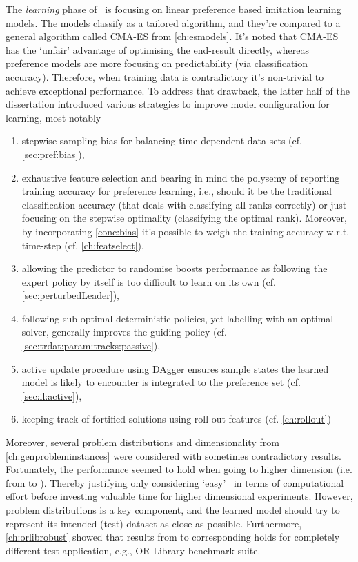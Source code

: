 The \emph{learning} phase of \Alice\ is focusing on linear preference based 
imitation learning models. The models classify as a tailored algorithm, and 
they're compared to a general algorithm called CMA-ES from \cref{ch:esmodels}. 
It's noted that CMA-ES has the `unfair' advantage of optimising the end-result 
directly, whereas preference models are more focusing on predictability (via 
classification accuracy). Therefore, when training data is contradictory it's 
non-trivial to achieve exceptional performance. 
To address that drawback, the latter half of the dissertation introduced 
various strategies to improve model configuration for learning, most notably 
\begin{enumerate}
    \item \label{conc:bias} stepwise sampling bias for balancing time-dependent 
    data sets (cf. \cref{sec:pref:bias}),
    \item exhaustive feature selection and bearing in mind the polysemy of 
    reporting training accuracy for preference learning, i.e., should it be the 
    traditional classification accuracy (that deals with classifying all ranks 
    correctly) or just focusing on the stepwise optimality (classifying the 
    optimal rank). Moreover, by incorporating \ref{conc:bias} it's possible to 
    weigh the training accuracy w.r.t. time-step 
    (cf. \cref{ch:featselect}),
    \item allowing the predictor to randomise boosts performance as following 
    the expert policy by itself is too difficult to learn on its own (cf. 
    \cref{sec:perturbedLeader}),
    \item following sub-optimal deterministic policies, yet labelling with an 
    optimal solver, generally improves the guiding policy (cf. 
    \cref{sec:trdat:param:tracks:passive}),
    \item active update procedure using DAgger ensures sample states the 
    learned model is likely to encounter is integrated to the preference set
    (cf. \cref{sec:il:active}),
    \item keeping track of fortified solutions using roll-out features (cf. 
    \cref{ch:rollout})
\end{enumerate}
Moreover, several problem distributions and dimensionality from 
\cref{ch:genprobleminstances} were considered with sometimes contradictory 
results. Fortunately, the performance seemed to hold when going to higher 
dimension (i.e. from \Problem[6\times5]{} to \Problem[10\times10]{}). 
Thereby justifying only considering `easy' \JSP\ in terms of computational 
effort before investing valuable time for higher dimensional experiments. 
However, problem distributions is a key component, and the learned model should 
try to represent its intended (test) dataset as close as possible.
Furthermore, \cref{ch:orlibrobust} showed that results from \Problem{\train} to 
corresponding \Problem{\test} holds for completely different test application, 
e.g., OR-Library benchmark suite.

